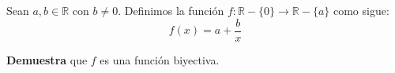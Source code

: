\documentclass[oneside]{style}
\begin{document}
\begin{questions}[label=\protect\circled{\bfseries\arabic*}]
    \question
    {
        Sean $a,b \in \mathbb{R}$ con $b \neq 0$. Definimos la función
        $f: \mathbb{R} - \{0\} \rightarrow \mathbb{R} - \{a\}$ como sigue:
        \begin{equation*}
            f(x) = a + \frac{b}{x}
        \end{equation*}

        \textbf{Demuestra} que $f$ es una función biyectiva. 
    }

\end{questions}
\end{document}
